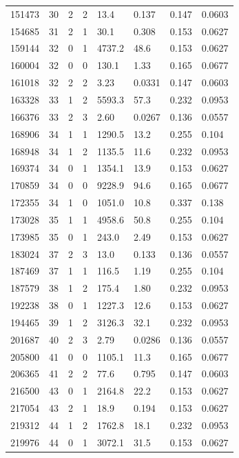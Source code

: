 \documentclass[preview]{standalone}
\begin{document}
{{{\begin{tabular}{L{1.2cm}C{1.2cm} C{0.3cm}C{0.5cm} C{1.4cm}C{1.4cm} C{1.4cm}C{1.4cm}}
  151473  &    30  & 2     &  2 &  13.4  & 0.137  & 0.147 &  0.0603   \\ 
  154685  &    31  & 2     &  1 &  30.1  & 0.308  & 0.153 &  0.0627   \\ 
  159144  &    32  & 0     &  1 &  4737.2  & 48.6  & 0.153 &  0.0627   \\ 
  160004  &    32  & 0     &  0 &  130.1  & 1.33  & 0.165 &  0.0677   \\ 
  161018  &    32  & 2     &  2 &  3.23  & 0.0331  & 0.147 &  0.0603   \\ 
  163328  &    33  & 1     &  2 &  5593.3  & 57.3  & 0.232 &  0.0953   \\ 
  166376  &    33  & 2     &  3 &  2.60  & 0.0267  & 0.136 &  0.0557   \\ 
  168906  &    34  & 1     &  1 &  1290.5  & 13.2  & 0.255 &  0.104   \\ 
  168948  &    34  & 1     &  2 &  1135.5  & 11.6  & 0.232 &  0.0953   \\ 
  169374  &    34  & 0     &  1 &  1354.1  & 13.9  & 0.153 &  0.0627   \\ 
  170859  &    34  & 0     &  0 &  9228.9  & 94.6  & 0.165 &  0.0677   \\ 
  172355  &    34  & 1     &  0 &  1051.0  & 10.8  & 0.337 &  0.138   \\ 
  173028  &    35  & 1     &  1 &  4958.6  & 50.8  & 0.255 &  0.104   \\ 
  173985  &    35  & 0     &  1 &  243.0  & 2.49  & 0.153 &  0.0627   \\ 
  183024  &    37  & 2     &  3 &  13.0  & 0.133  & 0.136 &  0.0557   \\ 
  187469  &    37  & 1     &  1 &  116.5  & 1.19  & 0.255 &  0.104   \\ 
  187579  &    38  & 1     &  2 &  175.4  & 1.80  & 0.232 &  0.0953   \\ 
  192238  &    38  & 0     &  1 &  1227.3  & 12.6  & 0.153 &  0.0627   \\ 
  194465  &    39  & 1     &  2 &  3126.3  & 32.1  & 0.232 &  0.0953   \\ 
  201687  &    40  & 2     &  3 &  2.79  & 0.0286  & 0.136 &  0.0557   \\ 
  205800  &    41  & 0     &  0 &  1105.1  & 11.3  & 0.165 &  0.0677   \\ 
  206365  &    41  & 2     &  2 &  77.6  & 0.795  & 0.147 &  0.0603   \\ 
  216500  &    43  & 0     &  1 &  2164.8  & 22.2  & 0.153 &  0.0627   \\ 
  217054  &    43  & 2     &  1 &  18.9  & 0.194  & 0.153 &  0.0627   \\ 
  219312  &    44  & 1     &  2 &  1762.8  & 18.1  & 0.232 &  0.0953   \\ 
  219976  &    44  & 0     &  1 &  3072.1  & 31.5  & 0.153 &  0.0627   \\ 
\hline 
\end{tabular} 

}}}
\end{document}
